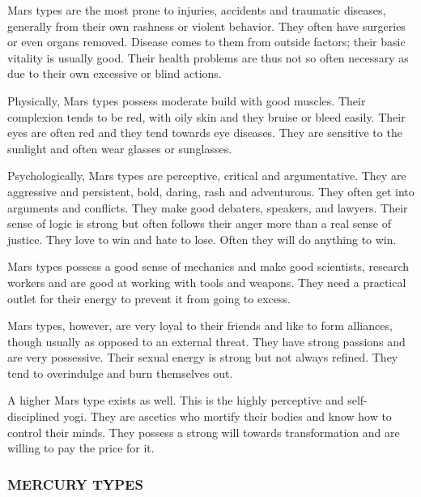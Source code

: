  

Mars types are the most prone to injuries, accidents and traumatic diseases, generally from their own rashness or violent behavior. They often have surgeries or even organs removed. Disease comes to them from outside factors; their basic vitality is usually good. Their health problems are thus not so often necessary as due to their own excessive or blind actions.

 

Physically, Mars types possess moderate build with good muscles. Their complexion tends to be red, with oily skin and they bruise or bleed easily. Their eyes are often red and they tend towards eye diseases. They are sensitive to the sunlight and often wear glasses or sunglasses.

 

Psychologically, Mars types are perceptive, critical and argumentative. They are aggressive and persistent, bold, daring, rash and adventurous. They often get into arguments and conflicts. They make good debaters, speakers, and lawyers. Their sense of logic is strong but often follows their anger more than a real sense of justice. They love to win and hate to lose. Often they will do anything to win.

 

Mars types possess a good sense of mechanics and make good scientists, research workers and are good at working with tools and weapons. They need a practical outlet for their energy to prevent it from going to excess.

 

Mars types, however, are very loyal to their friends and like to form alliances, though usually as opposed to an external threat. They have strong passions and are very possessive. Their sexual energy is strong but not always refined. They tend to overindulge and burn themselves out.

 

A higher Mars type exists as well. This is the highly perceptive and self-disciplined yogi. They are ascetics who mortify their bodies and know how to control their minds. They possess a strong will towards transformation and are willing to pay the price for it.

 



\subsubsection{MERCURY TYPES}
 


